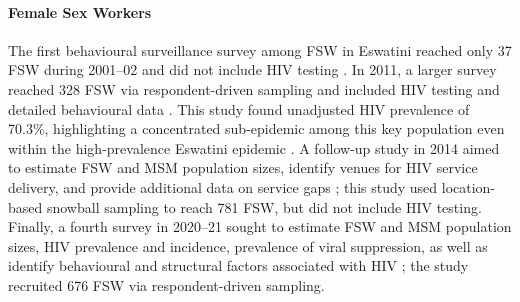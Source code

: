 \paragraph{Female Sex Workers}
The first behavioural surveillance survey among FSW in Eswatini
reached only 37 FSW during 2001--02 and did not include HIV testing \cite{EswIBBS2022}.
In 2011, a larger survey reached 328 FSW via respondent-driven sampling
and included HIV testing and detailed behavioural data \cite{Yam2013,Baral2014}.
This study found unadjusted HIV prevalence of 70.3\%,
highlighting a concentrated sub-epidemic among this key population
even within the high-prevalence Eswatini epidemic \cite{Baral2014}.
A follow-up study in 2014 aimed to
estimate FSW and MSM population sizes,
identify venues for HIV service delivery, and
provide additional data on service gaps \cite{EswKP2014};
this study used location-based snowball sampling \cite{Weir2005} to reach 781 FSW,
but did not include HIV testing.
Finally, a fourth survey in 2020--21 sought to estimate
FSW and MSM population sizes, HIV prevalence and incidence, prevalence of viral suppression,
as well as identify behavioural and structural factors associated with HIV \cite{EswIBBS2022};
the study recruited 676 FSW via respondent-driven sampling.
